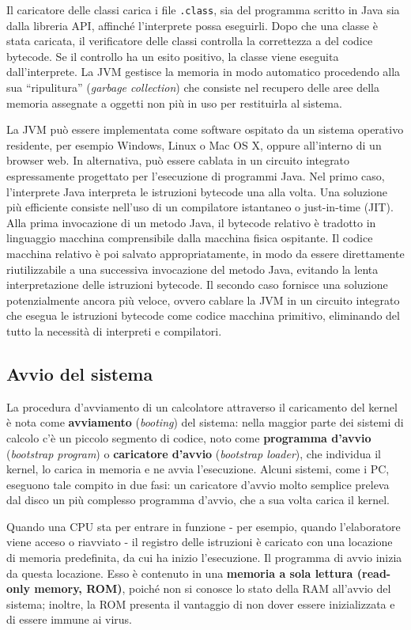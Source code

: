 \documentclass[11pt,a4paper]{article}
\begin{document}
Il caricatore delle classi carica i fi­le \texttt{.class}, sia del programma scritto in Java sia dalla libreria API, affinché l'interprete pos­sa eseguirli. Dopo che una classe è stata caricata, il verificatore delle classi controlla la cor­rettezza a del codice bytecode. Se il controllo ha un esito positivo, la classe viene eseguita dall'interprete. La JVM gestisce la memoria in modo automatico procedendo alla sua “ripulitura”
(\emph{garbage collection}) che consiste nel recupero delle aree della memoria assegnate a oggetti
non più in uso per restituirla al sistema.

La JVM può essere implementata come software ospitato da un sistema operativo resi­dente, per esempio Windows, Linux o Mac OS X, oppure all'interno di un browser web. In
alternativa, può essere cablata in un circuito integrato espressamente progettato per l'esecu­zione di programmi Java. Nel primo caso, l'interprete Java interpreta le istruzioni bytecode
una alla volta. Una soluzione più efficiente consiste nell'uso di un compilatore istantaneo o
just-in-time (JIT). Alla prima invocazione di un metodo Java, il bytecode relativo è tradotto
in linguaggio macchina comprensibile dalla macchina fisica ospitante. Il codice macchina
relativo è poi salvato appropriatamente, in modo da essere direttamente riutilizzabile a una
successiva invocazione del metodo Java, evitando la lenta interpretazione delle istruzioni
bytecode. Il secondo caso fornisce una soluzione potenzialmente ancora più veloce, ovvero cablare la JVM in un circuito
integrato che esegua le istruzioni bytecode come codice macchina pri­mitivo, eliminando del tutto la necessità di interpreti e compilatori.

\subsection{Avvio del sistema}
La procedura d'avviamento di un calcolatore attraverso il caricamento del kernel
è nota come \textbf{avviamento} (\emph{booting}) del sistema: nella maggior parte dei sistemi di calcolo c'è
un piccolo segmento di codice, noto come \textbf{programma d'avvio} (\emph{bootstrap program}) o \textbf{carica­tore d'avvio} (\emph{bootstrap loader}), che individua il kernel, lo carica in memoria e ne avvia l'ese­cuzione. Alcuni sistemi, come i PC, eseguono tale compito in due fasi: un caricatore d'avvio
molto semplice preleva dal disco un più complesso programma d'avvio, che a sua volta cari­ca il kernel.

Quando una CPU sta per entrare in funzione - per esempio, quando l'elaboratore vie­ne acceso o riavviato - il registro delle istruzioni è caricato con una locazione di memoria
predefinita, da cui ha inizio l'esecuzione. Il programma di avvio inizia da questa locazione.
Esso è contenuto in una \textbf{memoria a sola lettura (read-only memory, ROM)}, poiché non si
conosce lo stato della RAM all'avvio del sistema; inoltre, la ROM presenta il vantaggio di non
dover essere inizializzata e di essere immune ai virus.
\end{document}
